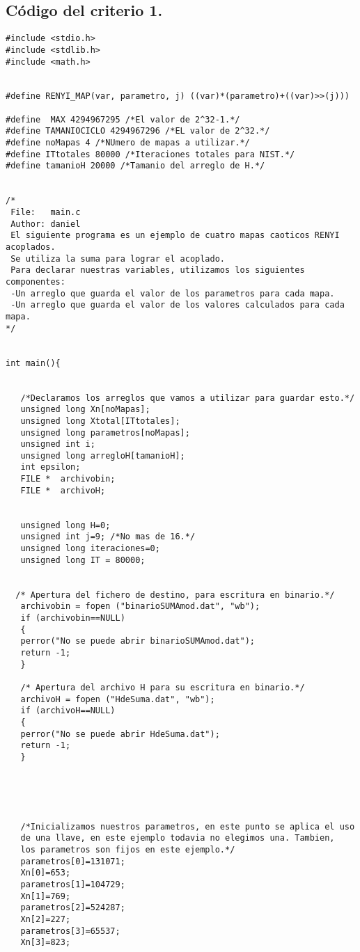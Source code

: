\documentclass[12pt,3p]{elsarticle}
\begin{document}
\subsection{Código del criterio 1.}
\begin{verbatim}
#include <stdio.h>
#include <stdlib.h>
#include <math.h>


#define RENYI_MAP(var, parametro, j) ((var)*(parametro)+((var)>>(j)))

#define  MAX 4294967295 /*El valor de 2^32-1.*/
#define TAMANIOCICLO 4294967296 /*EL valor de 2^32.*/
#define noMapas 4 /*NUmero de mapas a utilizar.*/
#define ITtotales 80000 /*Iteraciones totales para NIST.*/
#define tamanioH 20000 /*Tamanio del arreglo de H.*/


/*
 File:   main.c
 Author: daniel
 El siguiente programa es un ejemplo de cuatro mapas caoticos RENYI acoplados.
 Se utiliza la suma para lograr el acoplado.
 Para declarar nuestras variables, utilizamos los siguientes componentes:
 -Un arreglo que guarda el valor de los parametros para cada mapa.
 -Un arreglo que guarda el valor de los valores calculados para cada mapa.
*/


int main(){
 
   
   /*Declaramos los arreglos que vamos a utilizar para guardar esto.*/
   unsigned long Xn[noMapas];
   unsigned long Xtotal[ITtotales]; 
   unsigned long parametros[noMapas];
   unsigned int i;
   unsigned long arregloH[tamanioH];
   int epsilon;
   FILE *  archivobin; 
   FILE *  archivoH;
   

   unsigned long H=0; 
   unsigned int j=9; /*No mas de 16.*/
   unsigned long iteraciones=0;
   unsigned long IT = 80000;


  /* Apertura del fichero de destino, para escritura en binario.*/
   archivobin = fopen ("binarioSUMAmod.dat", "wb");
   if (archivobin==NULL)
   {
   perror("No se puede abrir binarioSUMAmod.dat");
   return -1;
   }
   
   /* Apertura del archivo H para su escritura en binario.*/
   archivoH = fopen ("HdeSuma.dat", "wb");
   if (archivoH==NULL)
   {
   perror("No se puede abrir HdeSuma.dat");
   return -1;
   }
   
   
   


   /*Inicializamos nuestros parametros, en este punto se aplica el uso
   de una llave, en este ejemplo todavia no elegimos una. Tambien,
   los parametros son fijos en este ejemplo.*/
   parametros[0]=131071;
   Xn[0]=653;
   parametros[1]=104729;
   Xn[1]=769;
   parametros[2]=524287;
   Xn[2]=227;
   parametros[3]=65537;
   Xn[3]=823;
                  

\end{verbatim}
\end{document}

